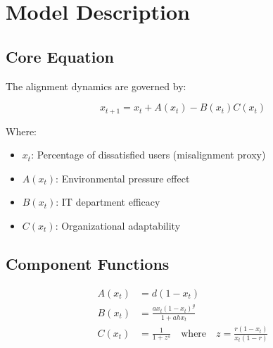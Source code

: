 \documentclass[a4paper, 12pt]{article}
\begin{document}
\section{Model Description}
\subsection{Core Equation}
The alignment dynamics are governed by:

\begin{equation}
	x_{t + 1} = x_t + A(x_t) - B(x_t)C(x_t)
\end{equation}

Where:
\begin{itemize}
	\item $x_t$: Percentage of dissatisfied users (misalignment proxy)
	\item $A(x_t)$: Environmental pressure effect
	\item $B(x_t)$: IT department efficacy
	\item $C(x_t)$: Organizational adaptability
\end{itemize}

\subsection{Component Functions}
\begin{align}
	A(x_t) & = d(1 - x_t)                                                                     \\
	B(x_t) & = \frac{a x_t (1 - x_t)^g}{1 + a h x_t}                                          \\
	C(x_t) & = \frac{1}{1 + z^s} \quad \text{where} \quad z = \frac{r (1 - x_t)}{x_t (1 - r)}
\end{align}
\end{document}
